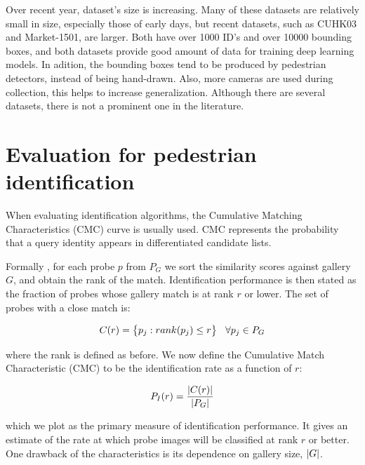 Over recent year, dataset's size is increasing. Many of these datasets are relatively small in size, especially those of early days, but recent datasets, such as CUHK03 and Market-1501, are larger. Both have over 1000 ID's and over 10000 bounding boxes, and both datasets provide good amount of data for training deep learning models. In adition, the bounding boxes tend to be produced by pedestrian detectors, instead of being hand-drawn. Also, more cameras are used during collection, this helps to increase generalization. Although there are several datasets, there is not a prominent one in the literature.

\section{Evaluation for pedestrian identification}


When evaluating identification algorithms, the Cumulative Matching Characteristics (CMC) curve is usually used. CMC represents the probability that a query identity appears in differentiated candidate lists.

Formally \cite{faceCMC}, for each probe $p$ from $P_{G}$ we sort the similarity scores against gallery $G$, and obtain the rank of the match. Identification performance is then stated as the fraction of probes whose gallery match is at rank $r$  or lower. The set of probes with a close match is:

$$ C(r) = \big\{ p_{j}: rank(p_{j}) \leq r  \bigr\} \hspace{0.3cm} \forall p_{j} \in P_{G}  $$

where the rank is defined as before. We now define the Cumulative Match Characteristic (CMC) to be the identification rate as a function of $r$:

$$ P_{I}(r) = \dfrac{\left|C(r)\right|}{\left|P_{G}\right|} $$

which we plot as the primary measure of identification performance. It gives an estimate of the rate at which probe images will be classified at rank $r$ or better. One drawback of the characteristics is its dependence on gallery size, $\left|G\right|$.
